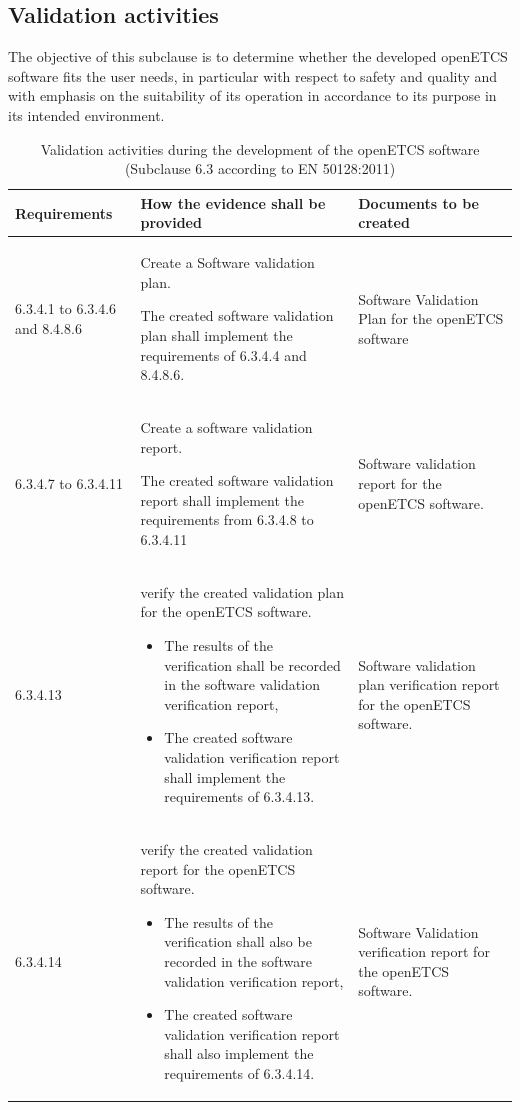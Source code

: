 \documentclass{template/openetcs_report}
\begin{document}
\subsection{Validation activities}
\begin{flushleft}
The objective of this subclause is to determine whether the developed openETCS software fits the user needs, in particular with respect to safety and quality and with emphasis on the suitability of its operation in accordance to its purpose in its intended environment.
\end{flushleft}
{\footnotesize\sffamily\centering
\begin{longtable}{|p{2cm}|p{9cm}|p{3cm}|}
\caption{Validation activities during the development of the openETCS software (Subclause 6.3 according to EN 50128:2011)}\\
\hline
\bfseries Requirements & \bfseries How the evidence shall be provided & \bfseries Documents to be created\\
\hline
\hline
\endhead
\hline
\endfoot

6.3.4.1 to 6.3.4.6 and 8.4.8.6 & Create a Software validation plan.

The created software validation plan shall implement the requirements of 6.3.4.4 and 8.4.8.6.
& Software Validation Plan for the openETCS software \\ 
\hline
6.3.4.7 to 6.3.4.11 & Create a software validation report.

The created software validation report shall implement the requirements from 6.3.4.8 to 6.3.4.11
& Software validation report for the openETCS software.\\ 
\hline
6.3.4.13 & verify the created validation plan for the openETCS software. 
\begin{itemize}\itemsep=0pt
  \item The results of the verification shall be recorded in the software validation verification report,
  \item The created software validation verification report shall implement the requirements of 6.3.4.13. 
\end{itemize}
& Software validation plan verification report for the openETCS software.\\ 
\hline
6.3.4.14 & verify the created validation report for the openETCS software. 
\begin{itemize}\itemsep=0pt
  \item The results of the verification shall also be recorded in the software validation verification report,
  \item The created software validation verification report shall also implement the requirements of 6.3.4.14. 
\end{itemize} 
& Software Validation verification report for the openETCS software.\\ 
\hline
\end{longtable}}
\end{document}
